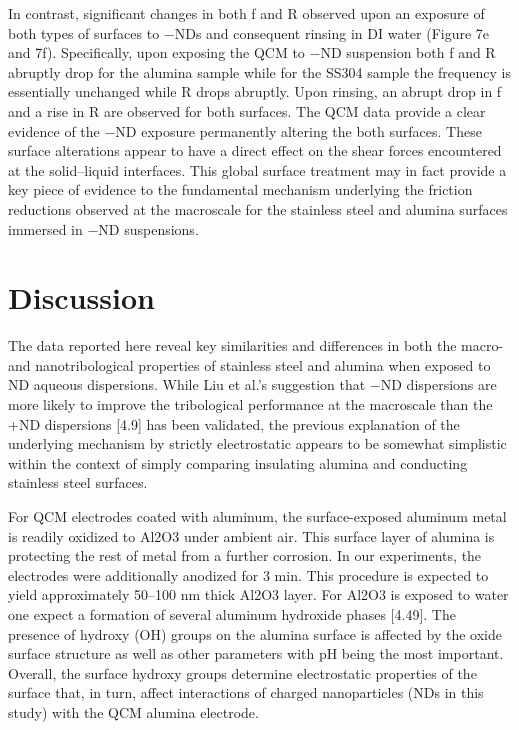 In contrast, significant changes in both f and R observed upon an exposure of both types of surfaces to −NDs and consequent rinsing in DI water (Figure 7e and 7f). Specifically, upon exposing the QCM to −ND suspension both f and R abruptly drop for the alumina sample while for the SS304 sample the frequency is essentially unchanged while R drops abruptly. Upon rinsing, an abrupt drop in f and a rise in R are observed for both surfaces. The QCM data provide a clear evidence of the −ND exposure permanently altering the both surfaces. These surface alterations appear to have a direct effect on the shear forces encountered at the solid–liquid interfaces. This global surface treatment may in fact provide a key piece of evidence to the fundamental mechanism underlying the friction reductions observed at the macroscale for the stainless steel and alumina surfaces immersed in −ND suspensions.

\section{Discussion}

The data reported here reveal key similarities and differences in both the macro- and nanotribological properties of stainless steel and alumina when exposed to ND aqueous dispersions. While Liu et al.’s suggestion that −ND dispersions are more likely to improve the tribological performance at the macroscale than the +ND dispersions [4.9] has been validated, the previous explanation of the underlying mechanism by strictly electrostatic appears to be somewhat simplistic within the context of simply comparing insulating alumina and conducting stainless steel surfaces.

For QCM electrodes coated with aluminum, the surface-exposed aluminum metal is readily oxidized to Al2O3 under ambient air. This surface layer of alumina is protecting the rest of metal from a further corrosion. In our experiments, the electrodes were additionally anodized for 3 min. This procedure is expected to yield approximately 50–100 nm thick Al2O3 layer. For Al2O3 is exposed to water one expect a formation of several aluminum hydroxide phases [4.49]. The presence of hydroxy (OH) groups on the alumina surface is affected by the oxide surface structure as well as other parameters with pH being the most important. Overall, the surface hydroxy groups determine electrostatic properties of the surface that, in turn, affect interactions of charged nanoparticles (NDs in this study) with the QCM alumina electrode.

